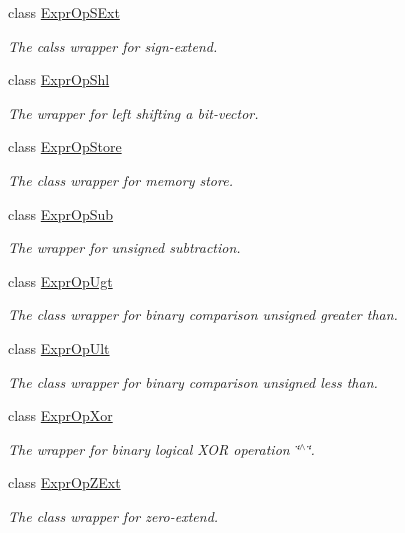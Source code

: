 \begin{DoxyCompactItemize}
class \mbox{\hyperlink{classilang_1_1_expr_op_s_ext}{Expr\+Op\+S\+Ext}}
\begin{DoxyCompactList}\small\item\em The calss wrapper for sign-\/extend. \end{DoxyCompactList}\item 
class \mbox{\hyperlink{classilang_1_1_expr_op_shl}{Expr\+Op\+Shl}}
\begin{DoxyCompactList}\small\item\em The wrapper for left shifting a bit-\/vector. \end{DoxyCompactList}\item 
class \mbox{\hyperlink{classilang_1_1_expr_op_store}{Expr\+Op\+Store}}
\begin{DoxyCompactList}\small\item\em The class wrapper for memory store. \end{DoxyCompactList}\item 
class \mbox{\hyperlink{classilang_1_1_expr_op_sub}{Expr\+Op\+Sub}}
\begin{DoxyCompactList}\small\item\em The wrapper for unsigned subtraction. \end{DoxyCompactList}\item 
class \mbox{\hyperlink{classilang_1_1_expr_op_ugt}{Expr\+Op\+Ugt}}
\begin{DoxyCompactList}\small\item\em The class wrapper for binary comparison unsigned greater than. \end{DoxyCompactList}\item 
class \mbox{\hyperlink{classilang_1_1_expr_op_ult}{Expr\+Op\+Ult}}
\begin{DoxyCompactList}\small\item\em The class wrapper for binary comparison unsigned less than. \end{DoxyCompactList}\item 
class \mbox{\hyperlink{classilang_1_1_expr_op_xor}{Expr\+Op\+Xor}}
\begin{DoxyCompactList}\small\item\em The wrapper for binary logical X\+OR operation \char`\"{}$^\wedge$\char`\"{}. \end{DoxyCompactList}\item 
class \mbox{\hyperlink{classilang_1_1_expr_op_z_ext}{Expr\+Op\+Z\+Ext}}
\begin{DoxyCompactList}\small\item\em The class wrapper for zero-\/extend. \end{DoxyCompactList}\item 

\end{DoxyCompactItemize}
